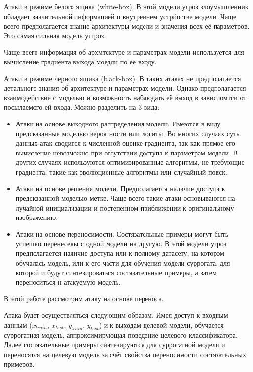 \documentclass[14pt,a4paper]{extarticle}
\begin{document}
Атаки в режиме белого ящика (white-box). В этой модели угроз злоумышленник обладает значительной
информацией о внутреннем устрйостве модели. Чаще всего предполагается знание архитектуры модели и значения
всех её параметров. Это самая сильная модель уггроз.

Чаще всего информация об архмтектуре и параметрах модели используется для
вычисление градиента выхода моедли по её входу.

Атаки в режиме черного ящика (black-box). В таких атаках не предполагается
детального знания об архитектуре и параметрах модели. Однако предполагается
взаимодействие с моделью и возможность наблюдать её выход в зависиомтси от
посылаемого ей входа. Можно разделить на 3 вида:

\renewcommand{\labelitemi}{-}
\begin{itemize}
    \item Атаки на основе выходного распределения модели. Имеются в виду
        предсказанные моделью вероятности или логиты. Во многих случаях суть
        данных атак сводится к численной оценке градиента, так как прямое его
        вычисление невозможно при отсутствии доступа к параметрам модели. В
        других случаях используются оптимизированные алгоритмы, не требующие
        градиента, такие как эволюционные алгоритмы или случайный поиск.

    \item Атаки на основе решения модели. Предполагается наличие доступа к
        предсказанной моделью метке. Чаще всего такие атаки основываются на
        лучайной инициализации и постепенном приближении к оригинальному
        изображению.

    \item Атаки на основе переносимости. Состязательные примеры могут быть
        успешно перенесены с одной модели на другую. В этой модели угроз
        предполагается наличие доступа или к полному датасету, на котором
        обучалась модель, или к его части для обучения модели-суррогата, для
        которой и будут синтезироваться состязательные примеры, а затем
        переноситься н атакуемую модель.
\end{itemize}

В этой работе рассмотрим атаку на основе переноса.

Атака будет осуществляться следующим образом. Имея доступ к входным данным
($x_{ train }$, $x_{ test }$, $y_{ train }$, $y_{ test }$) и к выходам целевой модели,
обучается суррогатная модель, аппроксимирующая поведение целевого классификатора.
Далее состязательные примеры синтезируются для суррогатной модели и переносятся
на целевую модель за счёт свойства переносимости состязательных примеров.
\end{document}
